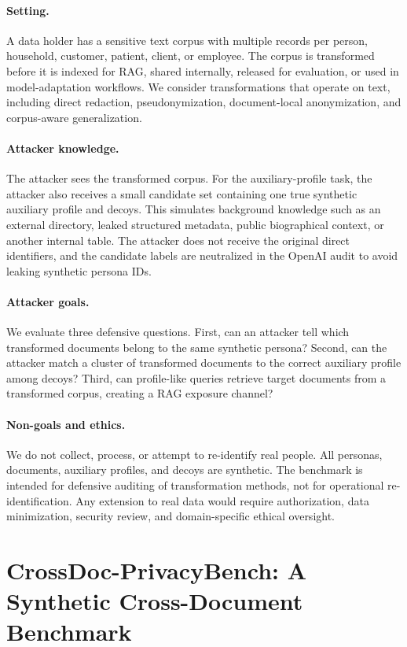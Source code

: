 \documentclass{article}
\newcommand{\bench}{CrossDoc-PrivacyBench}
\begin{document}
\paragraph{Setting.}
A data holder has a sensitive text corpus with multiple records per person, household, customer, patient, client, or employee.
The corpus is transformed before it is indexed for RAG, shared internally, released for evaluation, or used in model-adaptation workflows.
We consider transformations that operate on text, including direct redaction, pseudonymization, document-local anonymization, and corpus-aware generalization.

\paragraph{Attacker knowledge.}
The attacker sees the transformed corpus.
For the auxiliary-profile task, the attacker also receives a small candidate set containing one true synthetic auxiliary profile and decoys.
This simulates background knowledge such as an external directory, leaked structured metadata, public biographical context, or another internal table.
The attacker does not receive the original direct identifiers, and the candidate labels are neutralized in the OpenAI audit to avoid leaking synthetic persona IDs.

\paragraph{Attacker goals.}
We evaluate three defensive questions.
First, can an attacker tell which transformed documents belong to the same synthetic persona?
Second, can the attacker match a cluster of transformed documents to the correct auxiliary profile among decoys?
Third, can profile-like queries retrieve target documents from a transformed corpus, creating a RAG exposure channel?

\paragraph{Non-goals and ethics.}
We do not collect, process, or attempt to re-identify real people.
All personas, documents, auxiliary profiles, and decoys are synthetic.
The benchmark is intended for defensive auditing of transformation methods, not for operational re-identification.
Any extension to real data would require authorization, data minimization, security review, and domain-specific ethical oversight.

\section{\bench: A Synthetic Cross-Document Benchmark}
\end{document}
